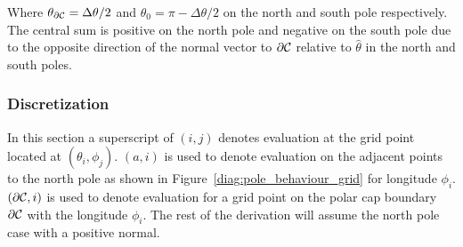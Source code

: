 Where $\theta_{\partial\mathcal{C}}=\Delta\theta/2$ and $\theta_0=\pi -\Delta\theta/2$ on the north and south pole respectively. The central sum is positive on the north pole and negative on the south pole due to the opposite direction of the normal vector to $\partial\mathcal{C}$ relative to $\hat\theta$ in the north and south poles.

\subsubsection{Discretization}
In this section a superscript of $(i,j)$ denotes evaluation at the grid point located at $(\theta_i,\phi_j)$. $(a,i)$ is used to denote evaluation on the adjacent points to the north pole as shown in Figure~\ref{diag:pole_behaviour_grid} for longitude $\phi_i$. $(\partial\mathcal{C}, i)$ is used to denote evaluation for a grid point on the polar cap boundary $\partial\mathcal{C}$ with the longitude $\phi_i$. The rest of the derivation will assume the north pole case with a positive normal.


